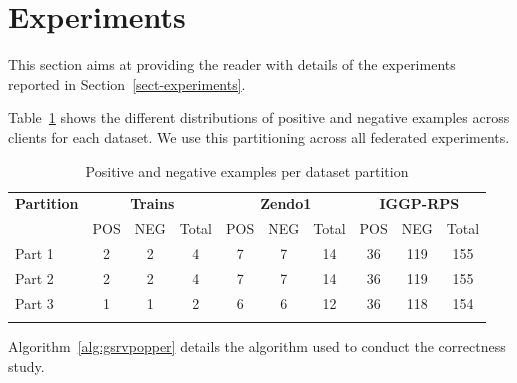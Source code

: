 \section{Experiments}
\label{app-experiments}

This section aims at providing the reader with details of the experiments reported in Section~\ref{sect-experiments}.

Table~\ref{tab:fed-partitions} shows the different distributions of positive and negative examples across clients for each dataset. We use this partitioning across all federated experiments. 

\begin{table}[ht]
\centering

\setlength{\tabcolsep}{6pt}
\begin{tabular}{l|ccc|ccc|ccc}
\toprule
\textbf{Partition}
& \multicolumn{3}{c|}{\textbf{Trains}}
& \multicolumn{3}{c|}{\textbf{Zendo1}}
& \multicolumn{3}{c}{\textbf{IGGP-RPS}} \\
& POS & NEG & Total
& POS & NEG & Total
& POS & NEG & Total \\
\midrule

Part 1
& 2 & 2 & 4
& 7 & 7 & 14
& 36 & 119 & 155 \\

Part 2
& 2 & 2 & 4
& 7 & 7 & 14
& 36 & 119 & 155 \\

Part 3
& 1 & 1 & 2
& 6 & 6 & 12
& 36 & 118 & 154 \\

\bottomrule \\
\end{tabular}
\caption{Positive and negative examples per dataset partition}
\label{tab:fed-partitions}
\end{table}

Algorithm~\ref{alg:gsrvpopper} details the algorithm used to conduct the correctness study.

